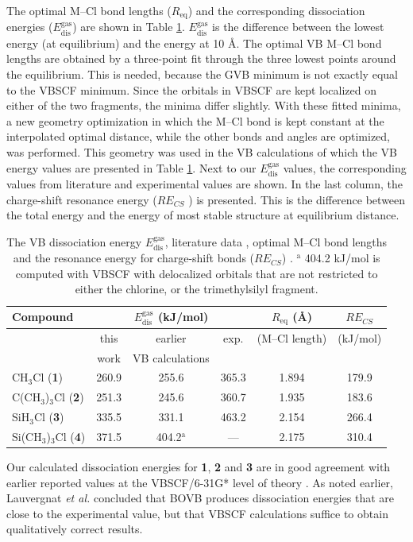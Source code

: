 The optimal M--Cl bond lengths ($R_\mathrm{eq}$) and the corresponding dissociation energies ($E_\mathrm{dis}^\mathrm{gas}$) are shown in Table \ref{ch3.tab.optimal}. $E_\mathrm{dis}^\mathrm{gas}$ is the difference between the lowest energy (at equilibrium) and the energy at 10 \AA. The optimal VB M--Cl bond lengths are obtained by a three-point fit through the three lowest points around the equilibrium. This is needed, because the GVB minimum is not exactly equal to the VBSCF minimum. Since the orbitals in VBSCF are kept localized on either of the two fragments, the minima differ slightly. With these fitted minima, a new geometry optimization in which the M--Cl bond is kept constant at the interpolated optimal distance, while the other bonds and angles are optimized, was performed. This geometry was used in the VB calculations of which the VB energy values are presented in Table \ref{ch3.tab.optimal}. Next to our $E_\mathrm{dis}^\mathrm{gas}$ values, the corresponding values from literature and experimental values \cite{lauvergnat,psu} are shown. In the last column, the charge-shift resonance energy ($RE_{CS}$ \cite{cs1}) is presented. This is the difference between the total energy and the energy of most stable structure at equilibrium distance. 
\begin{table}[hbt]
\center
\caption{The VB dissociation energy $E_\mathrm{dis}^\mathrm{gas}$, literature data \cite{lauvergnat,psu}, optimal M--Cl bond lengths and the resonance energy for charge-shift bonds ($RE_{CS}$) \cite{cs1}. $^\mathrm{a}$ 404.2 kJ/mol is computed with VBSCF with delocalized orbitals that  are not restricted to either the chlorine, or the trimethylsilyl fragment.}  
\begin{tabular}{|l|c|c|c|c|c|}
\hline
Compound & \multicolumn{3}{c|}{$E_\mathrm{dis}^\mathrm{gas}$ (kJ/mol)} & $R_\mathrm{eq}$ (\AA) & $RE_{CS}$ \\
\hline
&\multicolumn{1}{c|}{this} & \multicolumn{1}{c|}{earlier} & \multicolumn{1}{c|}{exp.} & (M--Cl length) & (kJ/mol) \\
&\multicolumn{1}{c|}{work} & \multicolumn{1}{c|}{VB calculations} & \multicolumn{1}{c|}{} & & \\
\hline
CH$_3$Cl (\textbf{1})& 260.9 & 255.6 \cite{lauvergnat} & 365.3 \cite{lauvergnat} & 1.894 & 179.9\\
C(CH$_3$)$_3$Cl (\textbf{2}) & 251.3 & 245.6 \cite{psu} & 360.7 \cite{psu} & 1.935 & 183.6\\
SiH$_3$Cl (\textbf{3})& 335.5 & 331.1 \cite{lauvergnat} & 463.2 \cite{lauvergnat} & 2.154 & 266.4\\
Si(CH$_3$)$_3$Cl (\textbf{4}) & 371.5 & 404.2$^\mathrm{a}$ \cite{psu} & --- & 2.175 & 310.4\\
\hline
\end{tabular}
\label{ch3.tab.optimal}
\end{table}
Our calculated dissociation energies for \textbf{1}, \textbf{2} and \textbf{3} are in good agreement with earlier reported values at the VBSCF/6-31G* level of theory \cite{lauvergnat, psu}. As noted earlier, Lauvergnat \textit{et al.} \cite{lauvergnat} concluded that BOVB produces dissociation energies that are close to the experimental value, but that VBSCF calculations suffice to obtain qualitatively correct results.

